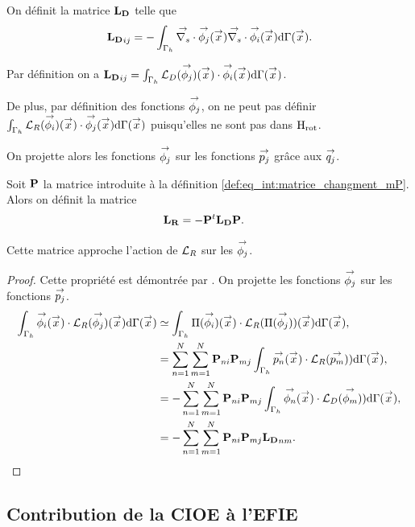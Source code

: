     \begin{defn}
      On définit la matrice \(\mLD\) telle que
      \begin{align*}
          \mLD_{ij} = - \int_{\Gamma_h} \vdivs \phij(\vx) \vdivs \phii(\vx) \dd{\Gamma}(\vx).
      \end{align*}
    \end{defn}

    Par définition on a \(\mLD_{ij} = \int_{\Gamma_h} \LD(\phij)(\vx)\cdot\phii(\vx)\dd{\Gamma}(\vx)\).

    De plus, par définition des fonctions \(\phij\), on ne peut pas définir \( \int_{\Gamma_h} \LR(\phii)(\vx) \cdot \phij(\vx) \dd{\Gamma}(\vx)\) puisqu'elles ne sont pas dans \(\Hrot\).

    On projette alors les fonctions \(\phij\) sur les fonctions \(\pj\) grâce aux \(\qj\).
    \begin{defn}
      Soit \(\mPP\) la matrice introduite à la définition \ref{def:eq_int:matrice_changment_mP}. Alors on définit la matrice
      \begin{align*}
        \mLR & = -\mPP^t\mLD\mPP.
      \end{align*}
    \end{defn}
    \begin{prop}
      Cette matrice approche l'action de \(\LR\) sur les \(\phij\).
    \end{prop}
    \begin{proof}
      Cette propriété est démontrée par \cite[eq.~(17)]{stupfel_implementation_2015}. On projette les fonctions \(\phij\) sur les fonctions \(\pj\).
      \begin{align*}
        \int_{\Gamma_h} \phii(\vx) \cdot \LR(\phij)(\vx) \dd{\Gamma}(\vx) &\simeq \int_{\Gamma_h} \Pi(\phii)(\vx) \cdot \LR(\Pi(\phij)) (\vx) \dd{\Gamma}(\vx),
        \\
        &=\sum_{n=1}^{N} \sum_{m=1}^{N} \mPP_{ni} \mPP_{mj} \int_{\Gamma_h}\pn(\vx)\cdot\LR(\ppm)) \dd{\Gamma}(\vx),
        \\
        &=-\sum_{n=1}^{N} \sum_{m=1}^{N} \mPP_{ni} \mPP_{mj} \int_{\Gamma_h}\phin(\vx)\cdot\LD(\phim)) \dd{\Gamma}(\vx),
        \\
        &=-\sum_{n=1}^{N} \sum_{m=1}^{N} \mPP_{ni} \mPP_{mj} \mLD_{nm}.
      \end{align*}
    \end{proof}

  \subsection{Contribution de la CIOE à l'EFIE}

